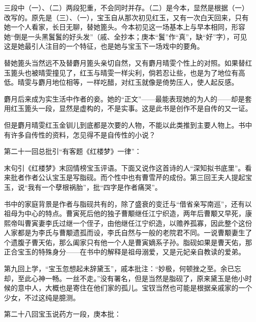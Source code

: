 \par 三段中（一）、（二）两段犯重，不会同时并存。（二）是今本，显然是根据（一）改写的。原先是（三）、（一），宝玉自从那次初见红玉，又有一次白天回来，只有她一个人看家，长日无聊，替她篦头。今本初见这一场基本上与早本相同，形容她“倒是一头黑鬒鬒的好头发”（戚、全抄本；庚本“鬒”作“真”，缺“好”字），可见这是她最引人注目的一个特征，也是她与宝玉下一场戏中的要角。
\par 替她篦头当然远不及替麝月篦头亲切自然，又有麝月晴雯个性上的对照。如果替红玉篦头也被晴雯撞见了，红玉与晴雯一样尖利，倘若忍让些，也是为了地位有高低。晴雯与麝月地位相等，一样吃醋，对红玉就像是倚势压人，使人起反感。
\par 麝月后来成为实生活中作者的妾。她的“正文”——最能表现她的为人的——却是套用红玉篦头一段，显然是虚构的，不是实事。这是此书是创作不是自传的又一证。
\par 但是麝月晴雯红玉金钏儿到底都是次要的人物，不能以此类推到主要人物上。书中有许多自传性的资料，怎见得不是自传性的小说？
\par 第二十一回总批引“有客题《红楼梦》一律”：
\par 末句引《红楼梦》末回情榜宝玉评语。下面又说作这首诗的人“深知拟书底里”。看来批者作者公认宝玉是写脂砚。而个性中也有曹雪芹的成份。第三回王夫人提起宝玉，说“我有一个孽根祸胎”，批“四字是作者痛哭”。
\par 书中的家庭背景是作者与脂砚共有的，除了盛衰的变迁与“借省亲写南巡”，还有以祖母为中心的特点。曹寅死后他的独子曹颙继任江宁织造，两年后曹颙又早死，康熙帝叫曹寅妻李氏过继一个侄子，由他继任江宁织造，以赡养孤寡，因此整个这份人家都是为李氏与曹颙遗孤而设，李氏自然与一般的老院君不同。一说曹颙妻生了个遗腹子曹天佑，那么阖家只有他一个人是曹寅嫡系子孙。脂砚如果是曹天佑，那正合宝玉的特殊身分——在书中的解释是祖母溺爱，又是元妃亲自教读的爱弟。
\par 第九回上学，“宝玉忽想起未辞黛玉”，戚本批注：“妙极，何顿挫之至。余已忘却，至此心神一畅。一丝不走。”没有署名，但是当然是脂砚了，原来黛玉是他小时候的意中人，大概也是寄住在他们家的孤儿。宝钗当然也可能是根据亲戚家的一个少女，不过这纯是臆测。
\par 第二十八回宝玉说药方一段，庚本批：
